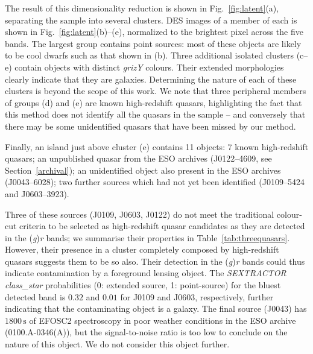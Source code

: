 \documentclass[fleqn,usenatbib]{mnras}
\begin{document}
The result of this dimensionality reduction is shown in Fig.~\ref{fig:latent}(a), separating the sample into several clusters. 
DES images of a member of each is shown in Fig.~\ref{fig:latent}(b)--(e), normalized to the brightest pixel across the five bands.
The largest group contains point sources: most of these objects are likely to be cool dwarfs such as that shown in (b).
Three additional isolated clusters (c--e) contain objects with distinct \textit{grizY} colours.
Their extended morphologies clearly indicate that they are galaxies.
Determining the nature of each of these clusters is beyond the scope of this work.
We note that three peripheral members of groups (d) and (e) are known high-redshift quasars, highlighting the fact that this method does not identify all the quasars in the sample -- and conversely that there may be some unidentified quasars that have been missed by our method.

Finally, an island just above cluster (e) contains 11 objects:
7 known high-redshift quasars;
an unpublished quasar from the ESO archives (J0122--4609, see Section~\ref{archival});
an unidentified object also present in the ESO archives (J0043--6028);
two further sources which had not yet been identified (J0109--5424 and J0603--3923).

Three of these sources (J0109, J0603, J0122) do not meet the traditional colour-cut criteria to be selected as high-redshift quasar candidates as they are detected in the (\textit{g})\textit{r} bands;
we summarise their properties in Table~\ref{tab:threequasars}.
However, their presence in a cluster completely composed by high-redshift quasars suggests them to be so also.
Their detection in the (\textit{g})\textit{r} bands could thus indicate contamination by a foreground lensing object.
The \emph{SEXTRACTOR} \textit{class\_star} probabilities (0: extended source, 1: point-source) for the bluest detected band is $0.32$ and $0.01$ for J0109 and J0603, respectively, further indicating that the contaminating object is a galaxy.
The final source (J0043) has $1800\,\text{s}$ of EFOSC2 spectroscopy in poor weather conditions in the ESO archive (0100.A-0346(A)), but the signal-to-noise ratio is too low to conclude on the nature of this object.
We do not consider this object further.
\end{document}
